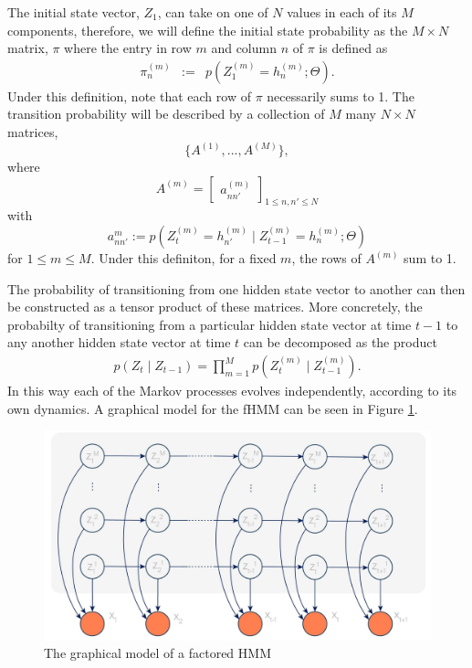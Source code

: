 \documentclass{amsart}
\begin{document}
The initial state vector, $Z_1$, can take on one of $N$ values in each of 
its $M$ components, therefore, we will define the 
initial state probability as the $M\times N$ matrix, $\pi$ where the 
entry in row $m$ and column $n$ of $\pi$ is defined as 
\begin{eqnarray*}
\pi_n^{(m)} & := & p\left(Z_1^{(m)}=h_{n}^{(m)}; \Theta\right).
\end{eqnarray*}
Under this definition, note that each row of $\pi$ necessarily sums to 
1. The transition probability will be described by a collection of $M$ many $N\times N$ matrices, 
\[
\{A^{(1)},...,A^{(M)}\},
\]
where 
\[
A^{(m)} = \begin{bmatrix}
a_{nn'}^{(m)}
\end{bmatrix}_{1\leq n,n'\leq N}
\]
with
\[
a_{nn'}^m := p(Z_t^{(m)} = 
h_{n'}^{(m)}\mid Z_{t-1}^{(m)} = h_n^{(m)}; \Theta)
\]
for $1\leq m\leq M$.  Under this definiton, for a fixed $m$, the 
rows of $A^{(m)}$ sum to 1. 

The probability of transitioning from one hidden state vector to another can 
then be constructed as a tensor product of these matrices.  More concretely, 
the probabilty of transitioning from a particular hidden state vector at time 
$t-1$ to any another hidden state vector at time $t$ can be decomposed as the product
\begin{eqnarray}\label{eqn:trans2}
p(Z_t\mid Z_{t-1}) = \prod_{m=1}^M p(Z_{t}^{(m)} \mid Z_{t-1}^{(m)}).
\end{eqnarray}
In this way each of the Markov processes evolves independently, according to 
its own dynamics. A graphical model for the fHMM can be seen in Figure 
\ref{fig:fHMM}.

\begin{figure}
\centering
\includegraphics[scale=0.1]{figures/fhmm.jpg}
\caption{The graphical model of a factored HMM}\label{fig:fHMM}
\end{figure}
\end{document}
